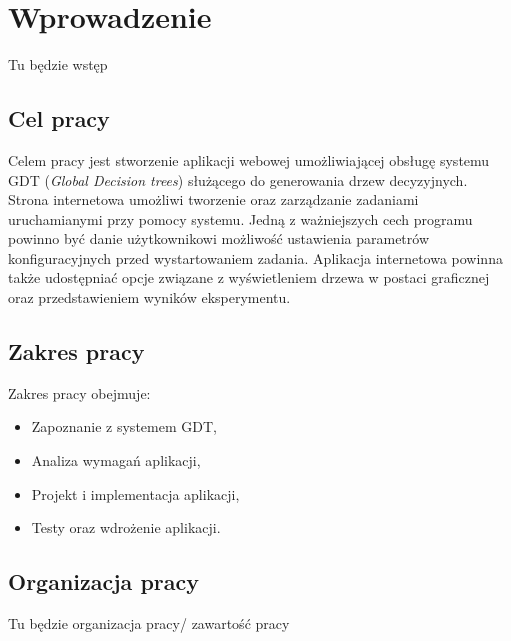 \chapter*{Wprowadzenie}
Tu będzie wstęp

\section*{Cel pracy}
Celem pracy jest stworzenie aplikacji webowej umożliwiającej obsługę systemu GDT (\textit{Global Decision trees}) służącego do generowania drzew decyzyjnych. Strona internetowa umożliwi tworzenie oraz zarządzanie zadaniami uruchamianymi przy pomocy systemu. Jedną z ważniejszych cech programu powinno być danie użytkownikowi możliwość ustawienia parametrów konfiguracyjnych przed wystartowaniem zadania. Aplikacja internetowa powinna także udostępniać opcje związane z wyświetleniem drzewa w postaci graficznej oraz przedstawieniem wyników eksperymentu.
\section*{Zakres pracy}
Zakres pracy obejmuje: 

\begin{itemize}
\item Zapoznanie z systemem GDT,
\item Analiza wymagań aplikacji,
\item Projekt i implementacja aplikacji, 
\item Testy oraz wdrożenie aplikacji.
\end{itemize}


\section*{Organizacja pracy}
Tu będzie organizacja pracy/ zawartość pracy  